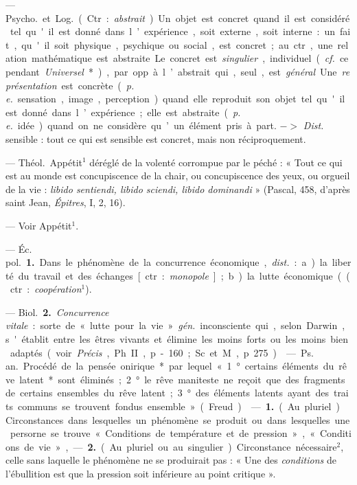 \begin{itemize}[leftmargin=1cm, label=, itemsep=11pt]
 — \si{Psycho.} et \si{Log.} (Ctr. :
{\it abstrait}). Un objet est concret quand
il est considéré tel qu'il est donné
dans l’expérience, soit externe, soit
interne : un fait, qu'il soit physique,
psychique ou social, est concret; au
ctr., une relation mathématique est
abstraite. Le concret est {\it singulier},
individuel ({\it cf.} cependant {\it Universel}*),
par opp. à l’abstrait qui, seul, est
{\it général}. Une {\it représentation} est concrète ({\it p. e.} sensation, image, perception) quand elle reproduit son
objet tel qu'il est donné dans l’expérience; elle est abstraite ({\it p. e.} idée)
quand on ne considère qu’un élément pris à part. $->$ {\it Dist.} sensible : tout ce qui est sensible est
concret, mais non réciproquement.

 — \si{Théol.} Appétit$^1$ déréglé de la volenté corrompue par
le péché : « Tout ce qui est au
monde est concupiscence de la chair,
ou concupiscence des yeux, ou
orgueil de la vie : {\it libido sentiendi,
libido sciendi, libido dominandi} »
(Pascal, 458, d’après saint Jean,
{\it Épitres}, I, 2, 16).

 — Voir Appétit$^1$.

 — \si{Éc. pol.} {\bf 1.} Dans le
phénomène de la concurrence économique, {\it dist.} : a) la liberté du travail
et des échanges [ctr. : {\it monopole}];
b) la lutte économique ((ctr. : {\it coopération}$^1$).

— \si{Biol.} {\bf 2.} {\it Concurrence vitale} :
sorte de « lutte pour la vie »  {\it gén.}
inconsciente qui, selon Darwin,
s'établit entre les êtres vivants et
élimine les moins forts ou les moins
bien adaptés (voir  {\it Précis}, Ph. II,
p- 160; Sc. et M., p. 275).

 — \si{Ps. an.} Procédé de
la pensée onirique* par lequel
« 1° certains éléments du rêve latent*
sont éliminés; 2° le rêve maniteste
ne reçoit que des fragments de certains ensembles du rêve latent;
3° des éléments latents ayant des
traits communs se trouvent fondus
ensemble » (Freud).

 — {\bf 1.} (Au pluriel). Circonstances dans lesquelles un phénomène se produit ou dans lesquelles une persorne se trouve
« Conditions de température et de
pression », « Conditions de vie », —
 {\bf 2.} (Au pluriel ou au singulier). Circonstance nécessaire$^2$, celle sans
laquelle le phénomène ne se produirait
pas : « Une des {\it conditions} de
l'ébullition est que la pression soit
inférieure au point critique ».


\end{itemize}
